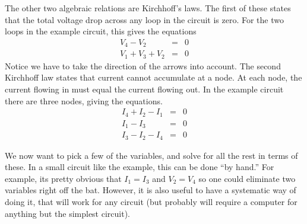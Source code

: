 The other two algebraic relations are Kirchhoff's laws. The first of these states
that the total voltage drop across any loop in the circuit is zero. For the two
loops in the example circuit, this gives the equations
\begin{eqnarray*}
V_4-V_2&=&0 \\
V_1+V_3+V_2&=& 0
\end{eqnarray*}
Notice we have to take the direction of the arrows into account. The second
Kirchhoff law states that current cannot accumulate at a node. At each node,
the current flowing in must equal the current flowing out. In the example
circuit there are three nodes, giving the equations.
\begin{eqnarray*}
I_4+I_2-I_1&=&0 \\
I_1-I_3&=&0 \\
I_3-I_2-I_4&=&0
\end{eqnarray*}

We now want to pick a few
of the variables, and solve for all the rest in terms of these. In a small
circuit like the example, this can be done ``by hand.''  For example, its pretty
obvious that $I_1=I_3$ and $V_2=V_4$ so one could eliminate two variables right off the
bat.
However, it is also useful
to have a systematic way of doing it, that will work for any circuit (but probably
will require a computer for anything but the simplest circuit).


